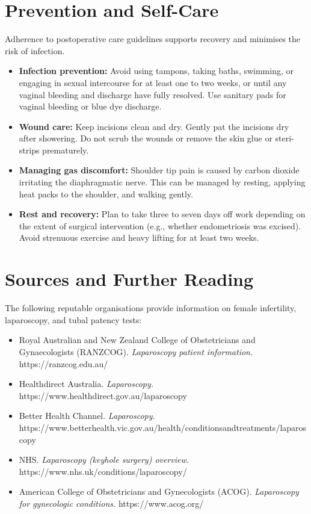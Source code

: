 \section*{Prevention and Self-Care}
Adherence to postoperative care guidelines supports recovery and minimises the risk of infection.
\begin{itemize}
    \item \textbf{Infection prevention:} Avoid using tampons, taking baths, swimming, or engaging in sexual intercourse for at least one to two weeks, or until any vaginal bleeding and discharge have fully resolved. Use sanitary pads for vaginal bleeding or blue dye discharge.
    \item \textbf{Wound care:} Keep incisions clean and dry. Gently pat the incisions dry after showering. Do not scrub the wounds or remove the skin glue or steri-strips prematurely.
    \item \textbf{Managing gas discomfort:} Shoulder tip pain is caused by carbon dioxide irritating the diaphragmatic nerve. This can be managed by resting, applying heat packs to the shoulder, and walking gently.
    \item \textbf{Rest and recovery:} Plan to take three to seven days off work depending on the extent of surgical intervention (e.g., whether endometriosis was excised). Avoid strenuous exercise and heavy lifting for at least two weeks.
\end{itemize}

\section*{Sources and Further Reading}
The following reputable organisations provide information on female infertility, laparoscopy, and tubal patency tests:
\begin{itemize}
    \item Royal Australian and New Zealand College of Obstetricians and Gynaecologists (RANZCOG). \textit{Laparoscopy patient information.} https://ranzcog.edu.au/
    \item Healthdirect Australia. \textit{Laparoscopy.} https://www.healthdirect.gov.au/laparoscopy
    \item Better Health Channel. \textit{Laparoscopy.} https://www.betterhealth.vic.gov.au/health/conditionsandtreatments/laparoscopy
    \item NHS. \textit{Laparoscopy (keyhole surgery) overview.} https://www.nhs.uk/conditions/laparoscopy/
    \item American College of Obstetricians and Gynecologists (ACOG). \textit{Laparoscopy for gynecologic conditions.} https://www.acog.org/
\end{itemize}
